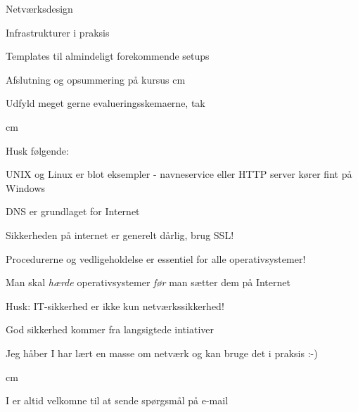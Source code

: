 \documentclass[20pt,landscape,a4paper,footrule]{foils}
\begin{document}

\begin{list1}
\item Netværksdesign
\item Infrastrukturer i praksis
\item Templates til almindeligt forekommende setups
\item Afslutning og opsummering på kursus
 cm
\item Udfyld meget gerne evalueringsskemaerne, tak
\end{list1}















 cm

\begin{list1}
\item Husk følgende:
\begin{list2}
\item UNIX og Linux er blot eksempler - navneservice eller HTTP
  server kører fint på Windows
\item DNS er grundlaget for Internet
\item Sikkerheden på internet er generelt dårlig, brug SSL!
\item Procedurerne og vedligeholdelse er essentiel for alle
  operativsystemer!
\item Man skal \emph{hærde} operativsystemer \emph{før} man sætter dem på
  Internet
\item Husk: IT-sikkerhed er ikke kun netværkssikkerhed!
\item God sikkerhed kommer fra langsigtede intiativer\\
\end{list2}
\item Jeg håber I har lært en masse om netværk og kan bruge det i praksis :-)
\end{list1}



\vskip 4cm

\begin{center}
\hlkbig

\myname

\myweb
{} cm

I er altid velkomne til at sende spørgsmål på e-mail
\end{center}
\end{document}
